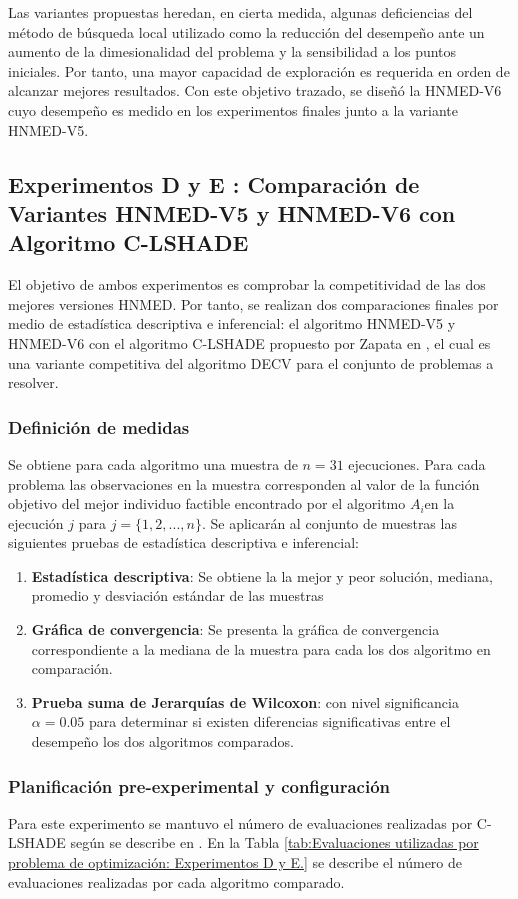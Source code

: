 Las variantes propuestas heredan, en cierta medida, algunas deficiencias del método de búsqueda local utilizado como la reducción del desempeño ante un aumento de la dimesionalidad del problema y la sensibilidad a los puntos iniciales. Por tanto, una mayor capacidad de exploración es requerida en orden de alcanzar mejores resultados. Con este objetivo trazado, se diseñó la HNMED-V6 cuyo desempeño es medido en los experimentos finales junto a la variante HNMED-V5.


\subsection{Experimentos D y E : Comparación de Variantes HNMED-V5 y HNMED-V6 con Algoritmo C-LSHADE}
El objetivo de ambos experimentos es comprobar la competitividad  de las dos mejores versiones HNMED. Por tanto, se realizan dos comparaciones finales por medio de estadística descriptiva e inferencial: el algoritmo HNMED-V5 y HNMED-V6 con el algoritmo C-LSHADE propuesto por Zapata en \cite{zapata_zapata_control_2017}, el cual es una variante competitiva del algoritmo DECV para el conjunto de problemas a resolver.
\subsubsection{Definición de medidas}
Se obtiene para cada algoritmo una muestra de $n=31$ ejecuciones. Para cada problema las observaciones en la muestra corresponden al valor de la función objetivo del mejor individuo factible encontrado por el algoritmo $A_i$en la ejecución $j$ para $j= \{ 1,2,...,n\}$. Se aplicarán al conjunto de muestras las siguientes pruebas de estadística descriptiva e inferencial:
\begin{enumerate}
	\item \textbf{Estadística descriptiva}: Se obtiene la la mejor y peor solución, mediana, promedio y desviación estándar de las muestras
	\item \textbf{Gráfica de convergencia}: Se presenta la gráfica de convergencia correspondiente a la mediana de la muestra para cada los dos algoritmo en comparación.
	\item \textbf{Prueba suma de Jerarquías de Wilcoxon}: con nivel significancia $\alpha=0.05$ para determinar si existen diferencias significativas entre el desempeño los dos algoritmos comparados. 
	
\end{enumerate}
\subsubsection{Planificación pre-experimental y configuración}
Para este experimento se mantuvo el número de evaluaciones realizadas por C-LSHADE según se describe en \cite{zapata_zapata_control_2017}. En la Tabla \ref{tab:Evaluaciones utilizadas por problema de optimización: Experimentos D y E.} se describe el número de evaluaciones realizadas por cada algoritmo comparado.

